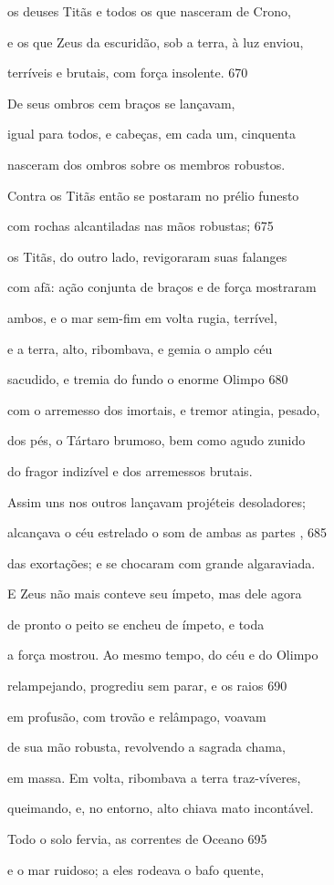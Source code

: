 os deuses Titãs e todos os que nasceram de Crono,

e os que Zeus da escuridão, sob a terra, à luz enviou,

terríveis e brutais, com força insolente. \num{670}

De seus ombros cem braços se lançavam,

igual para todos, e cabeças, em cada um, cinquenta

nasceram dos ombros sobre os membros robustos.

Contra os Titãs então se postaram no prélio funesto

com rochas alcantiladas nas mãos robustas; \num{675}

os Titãs, do outro lado, revigoraram suas falanges

com afã: ação conjunta de braços e de força mostraram

ambos, e o mar sem-fim em volta rugia, terrível,

e a terra, alto, ribombava, e gemia o amplo céu

sacudido, e tremia do fundo o enorme Olimpo \num{680}

com o arremesso dos imortais, e tremor atingia, pesado,

dos pés, o Tártaro brumoso, bem como agudo zunido

do fragor indizível e dos arremessos brutais.

Assim uns nos outros lançavam projéteis desoladores;

alcançava o céu estrelado o som de ambas as partes , \num{685}

das exortações; e se chocaram com grande algaraviada.

\quad{}E Zeus não mais conteve seu ímpeto, mas dele agora

de pronto o peito se encheu de ímpeto, e toda

a força mostrou. Ao mesmo tempo, do céu e do Olimpo

relampejando, progrediu sem parar, e os raios \num{690}

em profusão, com trovão e relâmpago, voavam

de sua mão robusta, revolvendo a sagrada chama,

em massa. Em volta, ribombava a terra traz-víveres,

queimando, e, no entorno, alto chiava mato incontável.

Todo o solo fervia, as correntes de Oceano \num{695}

e o mar ruidoso; a eles rodeava o bafo quente,

